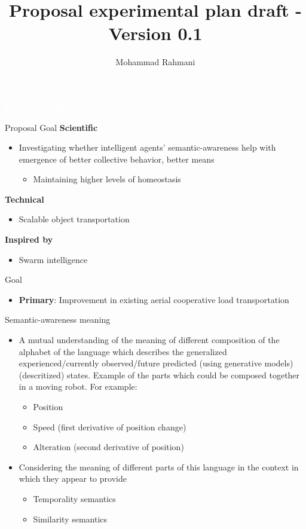 \documentclass[unknownkeysallowed]{beamer}
\title{Proposal experimental plan draft - Version 0.1}
\author{Mohammad Rahmani}
\institute{DECIDE Doctoral School}
\begin{document}
	\begin{frame}
		\date{}
		\maketitle
		\textcolor{white}{\textbf{12 August 2020}}
	\end{frame}

	\begin{frame}{Proposal Goal}
		\textbf{Scientific}
		\begin{itemize}
			\item Investigating whether intelligent agents' semantic-awareness help with emergence of better collective behavior, better means
			\begin{itemize}
				\item Maintaining higher levels of homeostasis
			\end{itemize}
		\end{itemize}
		
		\textbf{Technical}
		\begin{itemize}
			\item Scalable object transportation
		\end{itemize}
		\textbf{Inspired by}
		\begin{itemize}
			\item Swarm intelligence
		\end{itemize}
	\end{frame}

	\begin{frame}{Goal}
		\begin{itemize}
			\item \textbf{Primary}: Improvement in existing aerial cooperative load transportation
		\end{itemize}
	\end{frame}

	\begin{frame}{Semantic-awareness meaning}
		
		\begin{itemize}
			\item A mutual understanding of the meaning of different composition of the alphabet of the language which describes the generalized experienced/currently observed/future predicted (using generative models) (descritized) states. Example of the parts which could be composed together in a moving robot. For example: 
				\begin{itemize}
					\item Position
					\item Speed (first derivative of position change)
					\item Alteration (second derivative of position)
				\end{itemize} 
			\item Considering the meaning of different parts of this language in the context in which they appear to provide
				\begin{itemize}
					\item Temporality semantics
					\item Similarity semantics
				\end{itemize}
		\end{itemize}
	\end{frame}
\end{document}
